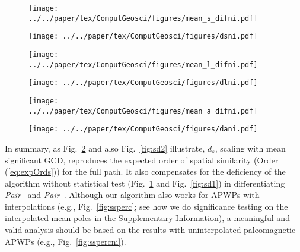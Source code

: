 \begin{figure*}[tbp]
  \captionsetup[subfigure]{singlelinecheck=off,justification=raggedright,aboveskip=-6pt,belowskip=-6pt}
  \centering
  \begin{subfigure}[htbp]{.495\textwidth}
    \centering
    \caption{}\label{fig:sd1ni}
    \texttt{[image: ../../paper/tex/ComputGeosci/figures/mean\_s\_difni.pdf]}
  \end{subfigure}
  \vspace{.5em}
  \begin{subfigure}[htbp]{.495\textwidth}
    \centering
    \caption{}\label{fig:sd2ni}
    \texttt{[image: ../../paper/tex/ComputGeosci/figures/dsni.pdf]}
  \end{subfigure}
  \begin{subfigure}[htbp]{.495\textwidth}
    \centering
    \caption{}\label{fig:ld1ni}
    \texttt{[image: ../../paper/tex/ComputGeosci/figures/mean\_l\_difni.pdf]}
  \end{subfigure}
  \vspace{.5em}
  \begin{subfigure}[htbp]{.495\textwidth}
    \centering
    \caption{}\label{fig:ld2ni}
    \texttt{[image: ../../paper/tex/ComputGeosci/figures/dlni.pdf]}
  \end{subfigure}
  \begin{subfigure}[htbp]{.495\textwidth}
    \centering
    \caption{}\label{fig:ad1ni}
    \texttt{[image: ../../paper/tex/ComputGeosci/figures/mean\_a\_difni.pdf]}
  \end{subfigure}
  \begin{subfigure}[htbp]{.495\textwidth}
    \centering
    \caption{}\label{fig:ad2ni}
    \texttt{[image: ../../paper/tex/ComputGeosci/figures/dani.pdf]}
  \end{subfigure}
\caption[Mean spatial, length, angular differences (without
interpolations)]{Mean spatial, length and angular differences between two paths
of the seven APWP pairs with no interpolated poles shown in
Fig.~\ref{fig:2traj}. Left column: results without significance testing imposed
in the metric; Right column: results with significance testing. See explanation
of Fig.~\ref{fig:ssperc}.}\label{fig:sspercni}
\end{figure*}

In summary, as Fig.~\ref{fig:sd2ni} and also Fig.~\ref{fig:sd2} illustrate,
$d_s$, scaling with mean significant GCD, reproduces the expected order of
spatial similarity (Order (\ref{eq:expOrds})) for the full path. It also
compensates for the deficiency of the algorithm without statistical test
(Fig.~\ref{fig:sd1ni} and Fig.~\ref{fig:sd1}) in differentiating
\emph{Pair}~\textbf{} and
\emph{Pair}~\textbf{}. Although our algorithm also works for
APWPs with interpolations (e.g., Fig.~\ref{fig:ssperc}; see how we do
significance testing on the interpolated mean poles in the Supplementary
Information), a meaningful and valid analysis should be based on the results
with uninterpolated paleomagnetic APWPs (e.g., Fig.~\ref{fig:sspercni}).


